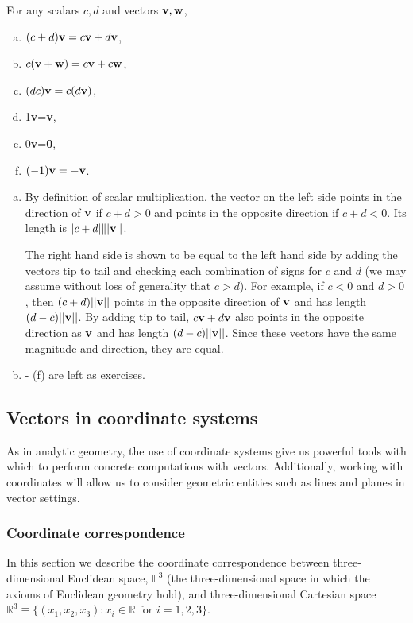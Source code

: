 \documentclass[12pt,letterpaper,reqno]{article}
\numberwithin{equation}{section}
\begin{document}
\begin{prop}
For any scalars $c,d$ and vectors ${\bf v}, {\bf w}$,
	\begin{enumerate}[(a)]
		\item $(c+d){\bf v}=c{\bf v}+d{\bf v}$,
		\item $c({\bf v}+{\bf w})=c{\bf v}+c{\bf w}$,
		\item $(dc){\bf v}=c(d{\bf v})$,
		\item 1{\bf v}={\bf v},
		\item 0{\bf v}={\bf 0},
		\item $(-1){\bf v}=-{\bf v}$.
	\end{enumerate}
\end{prop}

\begin{pf}
	\begin{enumerate}[(a)]
		\item By definition of scalar multiplication, the vector on the left side points in the direction of ${\bf v}$ if $c+d>0$ and points in the opposite direction if $c+d<0$. Its length is $|c+d|\||{\bf v}||$. 
		
		The right hand side is shown to be equal to the left hand side by adding the vectors tip to tail and checking each combination of signs for $c$ and $d$ (we may assume without loss of generality that $c>d$). For example, if $c<0$ and $d>0$, then $(c+d)||{\bf v}||$ points in the opposite direction of ${\bf v}$ and has length $(d-c)||{\bf v}||$. By adding tip to tail, $c{\bf v}+d{\bf v}$ also points in the opposite direction as ${\bf v}$ and has length $(d-c)||{\bf v}||$. Since these vectors have the same magnitude and direction, they are equal.
		\item - (f) are left as exercises.
	\end{enumerate}
\end{pf}

\subsection{Vectors in coordinate systems}
As in analytic geometry, the use of coordinate systems give us powerful tools with which to perform concrete computations with vectors. Additionally, working with coordinates will allow us to consider geometric entities such as lines and planes in vector settings. 

\subsubsection{Coordinate correspondence}
In this section we describe the coordinate correspondence between three-dimensional Euclidean space, $\mathbb{E}^3$ (the three-dimensional space in which the axioms of Euclidean geometry hold), and three-dimensional Cartesian space $\mathbb{R}^3\equiv \{(x_1,x_2,x_3):x_i \in \mathbb{R} \text{ for } i=1,2,3\}$.
\end{document}
